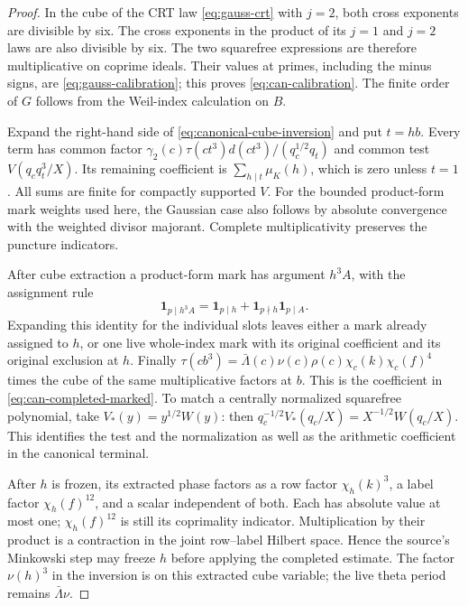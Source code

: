 \documentclass[11pt,a4paper]{article}
\numberwithin{equation}{section}
\theoremstyle{definition}
\theoremstyle{remark}
\newcommand{\ind}{\mathbf 1}
\begin{document}
\begin{proof}
In the cube of the CRT law \eqref{eq:gauss-crt} with $j=2$, both
cross exponents are divisible by six.  The cross exponents in the
product of its $j=1$ and $j=2$ laws are also divisible by six.
The two squarefree expressions are therefore multiplicative on coprime
ideals.  Their values at primes, including the minus signs, are
\eqref{eq:gauss-calibration}; this proves \eqref{eq:can-calibration}.
The finite order of $G$ follows from the Weil-index calculation on $B$.

Expand the right-hand side of \eqref{eq:canonical-cube-inversion}
and put $t=hb$.  Every term has common factor
$\gamma_2(c)\tau(ct^3)d(ct^3)/(q_c^{1/2}q_t)$ and common test
$V(q_cq_t^3/X)$.  Its remaining coefficient is
$\sum_{h\mid t}\mu_K(h)$, which is zero unless $t=1$.
All sums are finite for compactly supported $V$.  For the bounded
product-form mark weights used here, the Gaussian case also follows
by absolute convergence with the weighted divisor majorant.  Complete multiplicativity preserves the puncture indicators.

After cube extraction a product-form mark has argument $h^3A$,
with the assignment rule
\begin{equation}\label{eq:mark-cube-priority}
 \ind_{p\mid h^3A}=\ind_{p\mid h}
                     +\ind_{p\nmid h}\ind_{p\mid A}.
\end{equation}
Expanding this identity for the individual slots leaves either a mark
already assigned to $h$, or one live whole-index mark with its original
coefficient and its original exclusion at $h$.
Finally $\tau(cb^3)=\bar\Lambda(c)\nu(c)\rho(c)\chi_c(k)\chi_c(f)^4$
times the cube of the same multiplicative factors at $b$.
This is the coefficient in \eqref{eq:can-completed-marked}.
To match a centrally normalized squarefree polynomial, take
$V_*(y)=y^{1/2}W(y)$: then
$q_c^{-1/2}V_*(q_c/X)=X^{-1/2}W(q_c/X)$.
This identifies the test and the normalization as well as the
arithmetic coefficient in the canonical terminal.

After $h$ is frozen, its extracted phase factors as a row factor
$\chi_h(k)^3$, a label factor $\chi_h(f)^{12}$, and a scalar
independent of both.  Each has absolute value at most one;
$\chi_h(f)^{12}$ is still its coprimality indicator.
Multiplication by their product is a contraction in the joint
row--label Hilbert space.  Hence the source's Minkowski step may freeze $h$ before applying
the completed estimate.
The factor $\nu(h)^3$ in the inversion is on this extracted cube
variable; the live theta period remains $\bar\Lambda\nu$.
\end{proof}
\end{document}
